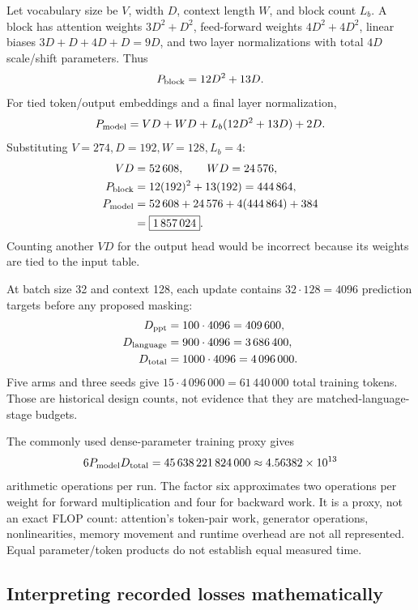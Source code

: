 Let vocabulary size be $V$, width $D$, context length $W$, and block
count $L_b$. A block has attention weights $3D^2+D^2$, feed-forward
weights $4D^2+4D^2$, linear biases $3D+D+4D+D=9D$, and two layer
normalizations with total $4D$ scale/shift parameters. Thus
\begin{equation}
 P_{\rm block}=12D^2+13D.
\end{equation}
For tied token/output embeddings and a final layer normalization,
\begin{equation}
 P_{\rm model}=VD+WD+
             L_b(12D^2+13D)+2D.
 \label{eq:paramcount}
\end{equation}
Substituting $V=274,D=192,W=128,L_b=4$:
\begin{align}
 VD&=52\,608,\qquad WD=24\,576,\\
 P_{\rm block}&=12(192)^2+13(192)=444\,864,\\
 P_{\rm model}
 &=52\,608+24\,576+4(444\,864)+384\\
 &=\boxed{1\,857\,024}.
\end{align}
Counting another $VD$ for the output head would be incorrect because its
weights are tied to the input table.

At batch size 32 and context 128, each update contains
$32\cdot128=4096$ prediction targets before any proposed masking:
\begin{align}
 D_{\rm ppt}&=100\cdot4096=409\,600,\\
 D_{\rm language}&=900\cdot4096=3\,686\,400,\\
 D_{\rm total}&=1000\cdot4096=4\,096\,000.
\end{align}
Five arms and three seeds give
$15\cdot4\,096\,000=61\,440\,000$ total training tokens.
Those are historical design counts, not evidence that they are
matched-language-stage budgets.

The commonly used dense-parameter training proxy gives
\begin{equation}
 6P_{\rm model}D_{\rm total}
 =45\,638\,221\,824\,000
 \approx4.56382\times10^{13}
\end{equation}
arithmetic operations per run. The factor six approximates two
operations per weight for forward multiplication and four for backward
work. It is a proxy, not an exact FLOP count: attention's token-pair
work, generator operations, nonlinearities, memory movement and runtime
overhead are not all represented. Equal parameter/token products do not
establish equal measured time.

\subsection{Interpreting recorded losses mathematically}

